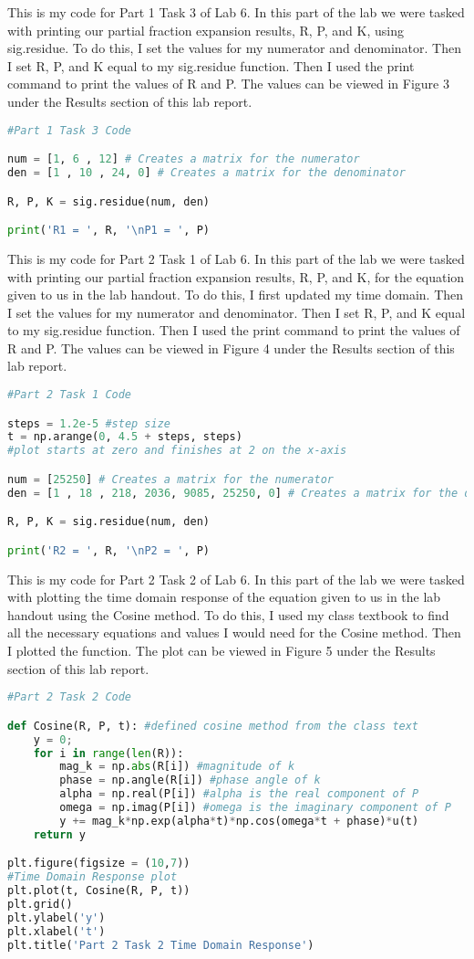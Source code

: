 \documentclass[12pt]{report}
\begin{document}
{This is my code for Part 1 Task 3 of Lab 6. In this part of the lab we were tasked with printing our partial fraction expansion results, R, P, and K, using sig.residue. To do this, I set the values for my numerator and denominator. Then I set R, P, and K equal to my sig.residue function. Then I used the print command to print the values of R and P. The values can be viewed in Figure 3 under the Results section of this lab report. }
\begin{lstlisting}[language=Python]
#Part 1 Task 3 Code

num = [1, 6 , 12] # Creates a matrix for the numerator
den = [1 , 10 , 24, 0] # Creates a matrix for the denominator

R, P, K = sig.residue(num, den)

print('R1 = ', R, '\nP1 = ', P)
\end{lstlisting}


{This is my code for Part 2 Task 1 of Lab 6. In this part of the lab we were tasked with printing our partial fraction expansion results, R, P, and K, for the equation given to us in the lab handout. To do this, I first updated my time domain. Then I set the values for my numerator and denominator. Then I set R, P, and K equal to my sig.residue function. Then I used the print command to print the values of R and P. The values can be viewed in Figure 4 under the Results section of this lab report. }
\begin{lstlisting}[language=Python]
#Part 2 Task 1 Code

steps = 1.2e-5 #step size
t = np.arange(0, 4.5 + steps, steps) 
#plot starts at zero and finishes at 2 on the x-axis

num = [25250] # Creates a matrix for the numerator
den = [1 , 18 , 218, 2036, 9085, 25250, 0] # Creates a matrix for the denominator

R, P, K = sig.residue(num, den)

print('R2 = ', R, '\nP2 = ', P)
\end{lstlisting}


{This is my code for Part 2 Task 2 of Lab 6. In this part of the lab we were tasked with plotting the time domain response of the equation given to us in the lab handout using the Cosine method. To do this, I used my class textbook to find all the necessary equations and values I would need for the Cosine method. Then I plotted the function. The plot can be viewed in Figure 5 under the Results section of this lab report. }
\begin{lstlisting}[language=Python]
#Part 2 Task 2 Code

def Cosine(R, P, t): #defined cosine method from the class text
    y = 0;
    for i in range(len(R)):
        mag_k = np.abs(R[i]) #magnitude of k
        phase = np.angle(R[i]) #phase angle of k
        alpha = np.real(P[i]) #alpha is the real component of P
        omega = np.imag(P[i]) #omega is the imaginary component of P
        y += mag_k*np.exp(alpha*t)*np.cos(omega*t + phase)*u(t)
    return y

plt.figure(figsize = (10,7))
#Time Domain Response plot
plt.plot(t, Cosine(R, P, t))
plt.grid()
plt.ylabel('y')
plt.xlabel('t')
plt.title('Part 2 Task 2 Time Domain Response')
\end{lstlisting}
\end{document}
